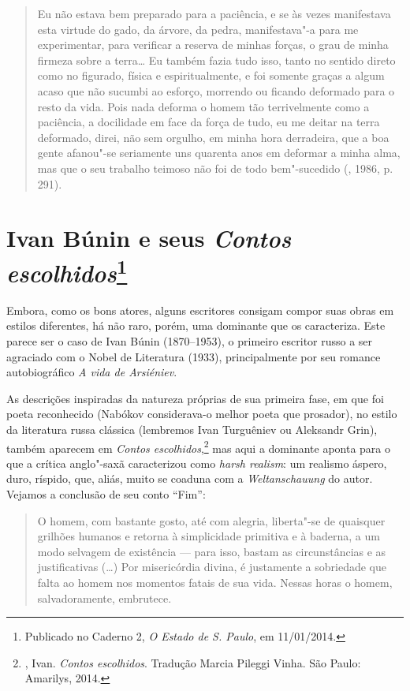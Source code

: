 \begin{quotation}
Eu não estava bem preparado para a paciência, e se às vezes manifestava esta virtude do gado, da árvore, da pedra, manifestava"-a para me experimentar, para verificar a reserva de minhas forças, o grau de minha firmeza sobre a terra\ldots{} Eu também fazia tudo isso, tanto no sentido direto como no figurado, física e espiritualmente, e foi somente graças a algum acaso que não sucumbi ao esforço, morrendo ou ficando deformado para o resto da vida. Pois nada deforma o homem tão terrivelmente como a paciência, a docilidade em face da força de tudo, eu me deitar na terra deformado, direi, não sem orgulho, em minha hora derradeira, que a boa gente afanou"-se seriamente uns quarenta anos em deformar a minha alma, mas que o seu trabalho teimoso não foi de todo bem"-sucedido (, 1986, p. 291).
\end{quotation}

\chapter{Ivan Búnin e seus \emph{Contos escolhidos}\footnote{Publicado no Caderno 2, \emph{O Estado de S. Paulo}, em 11/01/2014.}}
\label{bunin}

Embora, como os bons atores, alguns escritores consigam compor
suas obras em estilos diferentes, há não raro, porém, uma dominante
que os caracteriza. Este parece ser o caso de Ivan Búnin
(1870--1953), o primeiro escritor russo a ser agraciado com o
Nobel de Literatura (1933), principalmente por seu romance
autobiográfico \emph{A vida de Arsiéniev}.

As descrições inspiradas da natureza próprias de sua primeira
fase, em que foi poeta reconhecido (Nabókov considerava-o melhor
poeta que prosador), no estilo da literatura russa clássica
(lembremos Ivan Turguêniev ou Aleksandr Grin), também aparecem
em \emph{Contos escolhidos},\footnote{, Ivan.
\emph{Contos escolhidos}. Tradução Marcia Pileggi Vinha. São
Paulo: Amarilys, 2014.} mas aqui a dominante aponta para o que
a crítica anglo"-saxã caracterizou como \emph{harsh realism}:
um realismo áspero, duro, ríspido, que, aliás, muito se coaduna
com a \emph{Weltanschauung} do autor. Vejamos a conclusão de
seu conto ``Fim'': 

\begin{quotation}
O homem, com bastante gosto, até com alegria, liberta"-se de
quaisquer grilhões humanos e retorna à simplicidade primitiva e
à baderna, a um modo selvagem de existência --- para isso, bastam
as circunstâncias e as justificativas (\ldots{}) Por misericórdia
divina, é justamente a sobriedade que falta ao homem nos momentos
fatais de sua vida. Nessas horas o homem, salvadoramente,
embrutece.
\end{quotation}

